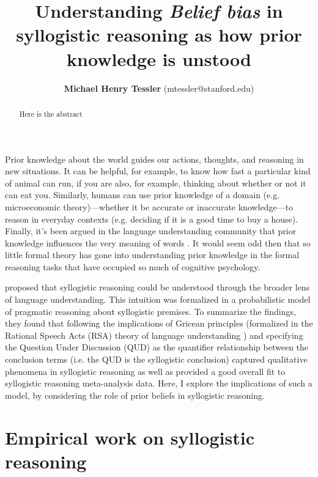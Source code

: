 \documentclass{llncs} %
\title{Understanding \emph{Belief bias} in syllogistic reasoning as how prior knowledge is unstood}
\author{{\large \bf Michael Henry Tessler} (mtessler@stanford.edu)}
\institute{Department of Psychology, Stanford University}
\begin{document}
\maketitle


\begin{abstract}
Here is the abstract
\end{abstract}

Prior knowledge about the world guides our actions, thoughts, and reasoning in new situations. It can be helpful, for example, to know how fast a particular kind of animal can run, if you are also, for example, thinking about whether or not it can eat you. Similarly, humans can use prior knowledge of a domain (e.g. microeconomic theory)---whether it be accurate or inaccurate knowledge---to reason in everyday contexts  (e.g. deciding if it is a good time to buy a house). Finally, it's been argued in the language understanding community that prior knowledge influences the very meaning of words \cite{LassGood2015}. It would seem odd then that so little formal theory has gone into understanding prior knowledge in the formal reasoning tasks that have occupied so much of cognitive psychology. 

 proposed that syllogistic reasoning could be understood through the broader lens of language understanding. This intuition was formalized in a probabilistic model of pragmatic reasoning about syllogistic premises. To summarize the findings, they found that following the implications of Gricean principles (formalized in the Rational Speech Acts (RSA) theory of language understanding \cite{Frank2012; Goodman2013}) and specifying the Question Under Discussion (QUD) as the quantifier relationship between the conclusion terms (i.e. the QUD is the syllogistic conclusion) captured qualitative phenomena in syllogistic reasoning as well as provided a good overall fit to syllogistic reasoning meta-analysis data. Here, I explore the implications of such a model, by considering the role of prior beliefs in syllogistic reasoning.

\section{Empirical work on syllogistic reasoning}
\end{document}
